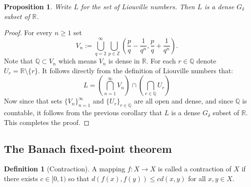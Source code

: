\documentclass[11pt,a4paper]{article}
\theoremstyle{definition}
\newtheorem{definition}{Definition}[section]
\theoremstyle{plain}
\newtheorem{proposition}[theorem]{Proposition}
\newcommand{\Z}{\mathbb{Z}}
\newcommand{\Q}{\mathbb{Q}}
\newcommand{\R}{\mathbb{R}}
\begin{document}
  \begin{proposition}
    Write $L$ for the set of Liouville numbers. Then $L$ is a dense
    $G_\delta$ subset of $\R$.
  \end{proposition}
  \begin{proof}
    For every $n \geq 1$ set
    \[
      V_n := \bigcup_{q=2}^{\infty} \bigcup_{p \in \Z}
      \left(\frac{p}{q} - \frac{1}{q^n},\frac{p}{q} + \frac{1}{q^n}\right).
    \]
    Note that $\Q \subset V_n$ which means $V_n$ is dense in $\R$. For each
    $r \in \Q$ denote $U_r = \R \setminus \{r\}$. It follows directly from
    the definition of Liouville numbers that:
    \[
      L = \left(\bigcap_{n=1}^{\infty}{V_n}\right) \cap
        \left(\bigcap_{r \in \Q}{U_r}\right)
    \]
    Now since that sets $\{V_n\}_{n=1}^{\infty}$ and $\{U_r\}_{r \in \Q}$
    are all open and dense, and since $\Q$ is countable, it follows from
    the previous corollary that $L$ is a dense $G_\delta$ subset of $\R$.
    This completes the proof.
  \end{proof}

  \subsection{The Banach fixed-point theorem}

  \begin{definition}[Contraction]
    A mapping $f \colon X \to X$ is called a contraction of $X$ if there 
    exists $c \in [0, 1)$ so that $d(f(x),f(y)) \le cd(x,y)$ for all 
    $x,y \in X$.
  \end{definition}
\end{document}
